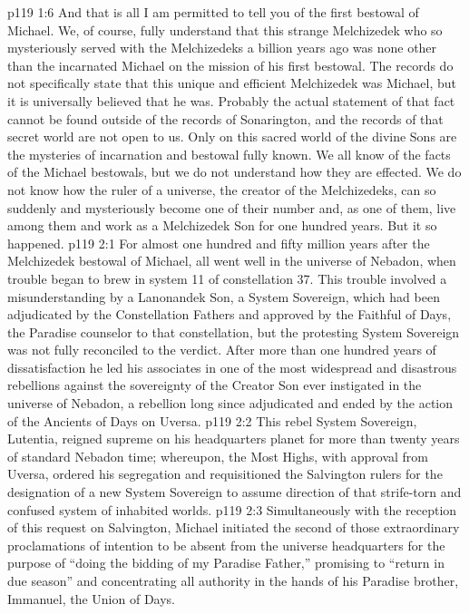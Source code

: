 \vs p119 1:6 And that is all I am permitted to tell you of the first bestowal of Michael. We, of course, fully understand that this strange Melchizedek who so mysteriously served with the Melchizedeks a billion years ago was none other than the incarnated Michael on the mission of his first bestowal. The records do not specifically state that this unique and efficient Melchizedek was Michael, but it is universally believed that he was. Probably the actual statement of that fact cannot be found outside of the records of Sonarington, and the records of that secret world are not open to us. Only on this sacred world of the divine Sons are the mysteries of incarnation and bestowal fully known. We all know of the facts of the Michael bestowals, but we do not understand how they are effected. We do not know how the ruler of a universe, the creator of the Melchizedeks, can so suddenly and mysteriously become one of their number and, as one of them, live among them and work as a Melchizedek Son for one hundred years. But it so happened.
\vs p119 2:1 For almost one hundred and fifty million years after the Melchizedek bestowal of Michael, all went well in the universe of Nebadon, when trouble began to brew in system 11 of constellation 37. This trouble involved a misunderstanding by a Lanonandek Son, a System Sovereign, which had been adjudicated by the Constellation Fathers and approved by the Faithful of Days, the Paradise counselor to that constellation, but the protesting System Sovereign was not fully reconciled to the verdict. After more than one hundred years of dissatisfaction he led his associates in one of the most widespread and disastrous rebellions against the sovereignty of the Creator Son ever instigated in the universe of Nebadon, a rebellion long since adjudicated and ended by the action of the Ancients of Days on Uversa.
\vs p119 2:2 This rebel System Sovereign, Lutentia, reigned supreme on his headquarters planet for more than twenty years of standard Nebadon time; whereupon, the Most Highs, with approval from Uversa, ordered his segregation and requisitioned the Salvington rulers for the designation of a new System Sovereign to assume direction of that strife\hyp{}torn and confused system of inhabited worlds.
\pc \vs p119 2:3 Simultaneously with the reception of this request on Salvington, Michael initiated the second of those extraordinary proclamations of intention to be absent from the universe headquarters for the purpose of “doing the bidding of my Paradise Father,” promising to “return in due season” and concentrating all authority in the hands of his Paradise brother, Immanuel, the Union of Days.
